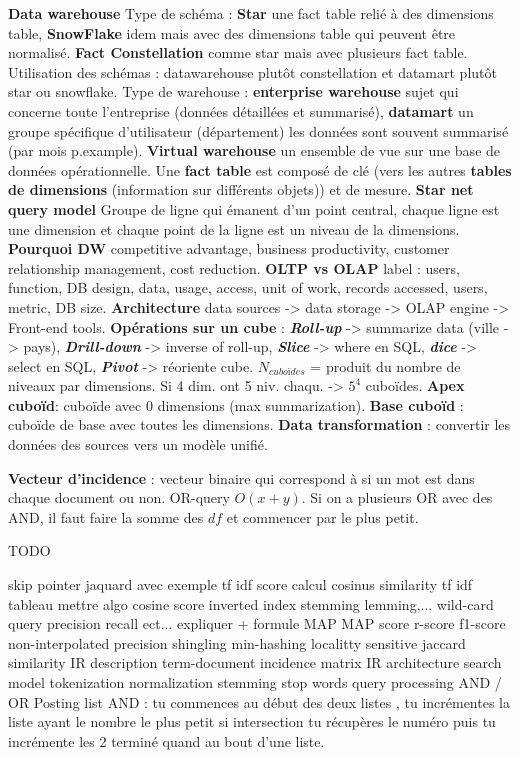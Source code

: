 \documentclass[9pt,a4paper]{report}
\begin{document}
\textbf{Data warehouse} Type de schéma : \textbf{Star} une fact table relié à des dimensions table, \textbf{SnowFlake} idem mais avec des dimensions table qui peuvent être normalisé. \textbf{ Fact Constellation} comme star mais avec plusieurs fact table. Utilisation des schémas : datawarehouse plutôt constellation et datamart plutôt star ou snowflake. Type de warehouse : \textbf{enterprise warehouse} sujet qui concerne toute l'entreprise (données détaillées et summarisé), \textbf{datamart} un groupe spécifique d'utilisateur (département) les données sont souvent summarisé (par mois p.example). \textbf{Virtual warehouse} un ensemble de vue sur une base de données opérationnelle. Une \textbf{fact table} est composé de clé (vers les autres \textbf{tables de dimensions} (information sur différents objets)) et de mesure. \textbf{Star net query model} Groupe de ligne qui émanent d'un point central, chaque ligne est une dimension et chaque point de la ligne est un niveau de la dimensions. \textbf{Pourquoi DW} competitive advantage, business productivity, customer relationship management, cost reduction. \textbf{OLTP vs OLAP} label : users, function, DB design, data, usage, access, unit of work, records accessed, users, metric, DB size. \textbf{Architecture} data sources -> data storage -> OLAP engine -> Front-end tools. \textbf{Opérations sur un cube} : \textit{\textbf{Roll-up}} -> summarize data (ville -> pays), \textit{\textbf{Drill-down}} -> inverse of roll-up, \textit{\textbf{Slice}} -> where en SQL, \textit{\textbf{dice}} -> select en SQL, \textit{\textbf{Pivot}} -> réoriente cube. \textbf{$N_{cuboïdes}$} = produit du nombre de niveaux par dimensions. Si 4 dim. ont 5 niv. chaqu. -> $5^4$ cuboïdes. \textbf{Apex cuboïd}: cuboïde avec $0$ dimensions (max summarization). \textbf{Base cuboïd} : cuboïde de base avec toutes les dimensions. \textbf{Data transformation} : convertir les données des sources vers un modèle unifié.

\newpage

\textbf{Vecteur d'incidence} : vecteur binaire qui correspond à si un mot est dans chaque document ou non. OR-query $O(x+y)$. Si on a plusieurs OR avec des AND, il faut faire la somme des $df$ et commencer par le plus petit. 

TODO

skip pointer
jaquard avec exemple
tf idf
score calcul
cosinus similarity
tf idf tableau
mettre algo cosine score
inverted index
stemming
lemming,...
wild-card query
precision recall ect... expliquer + formule
MAP
MAP score
r-score
f1-score
non-interpolated precision
shingling
min-hashing
localitty sensitive
jaccard similarity
IR description
term-document incidence matrix
IR architecture
search model
tokenization
normalization
stemming
stop words
query processing AND / OR
Posting list
AND : tu commences au début des deux listes , tu incrémentes la liste ayant le nombre le plus petit si intersection tu récupères le numéro puis tu incrémente les 2 terminé quand au bout d’une liste.
\end{document}
